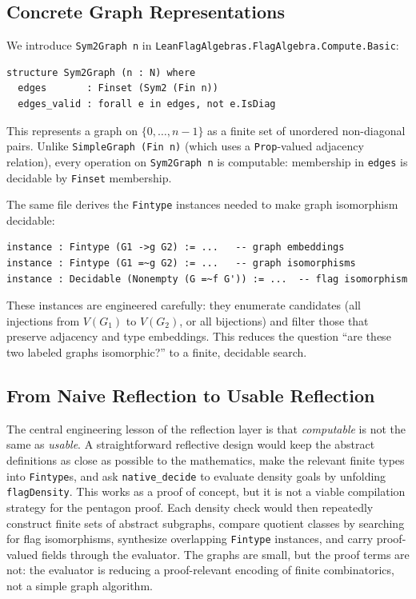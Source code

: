 \documentclass{article}
\newcommand{\lean}[1]{\texttt{#1}}
\begin{document}
\subsection{Concrete Graph Representations}

We introduce \lean{Sym2Graph n} in
\lean{LeanFlagAlgebras.FlagAlgebra.Compute.Basic}:
\begin{lstlisting}
structure Sym2Graph (n : N) where
  edges       : Finset (Sym2 (Fin n))
  edges_valid : forall e in edges, not e.IsDiag
\end{lstlisting}
This represents a graph on $\{0,\ldots,n-1\}$ as a finite set of unordered
non-diagonal pairs.  Unlike \lean{SimpleGraph (Fin n)} (which uses a
\lean{Prop}-valued adjacency relation), every operation on \lean{Sym2Graph n}
is computable: membership in \lean{edges} is decidable by \lean{Finset}
membership.

The same file derives the \lean{Fintype} instances needed to make graph
isomorphism decidable:
\begin{lstlisting}
instance : Fintype (G1 ->g G2) := ...   -- graph embeddings
instance : Fintype (G1 =~g G2) := ...   -- graph isomorphisms
instance : Decidable (Nonempty (G =~f G')) := ...  -- flag isomorphism
\end{lstlisting}
These instances are engineered carefully: they enumerate candidates (all
injections from $V(G_1)$ to $V(G_2)$, or all bijections) and filter those
that preserve adjacency and type embeddings.  This reduces the question ``are
these two labeled graphs isomorphic?'' to a finite, decidable search.

\subsection{From Naive Reflection to Usable Reflection}

The central engineering lesson of the reflection layer is that
\emph{computable} is not the same as \emph{usable}.  A straightforward
reflective design would keep the abstract definitions as close as possible to
the mathematics, make the relevant finite types into \lean{Fintype}s, and ask
\lean{native\_decide} to evaluate density goals by unfolding
\lean{flagDensity}.  This works as a proof of concept, but it is not a viable
compilation strategy for the pentagon proof.  Each density check would then
repeatedly construct finite sets of abstract subgraphs, compare quotient
classes by searching for flag isomorphisms, synthesize overlapping
\lean{Fintype} instances, and carry proof-valued fields through the evaluator.
The graphs are small, but the proof terms are not: the evaluator is reducing a
proof-relevant encoding of finite combinatorics, not a simple graph algorithm.
\end{document}
